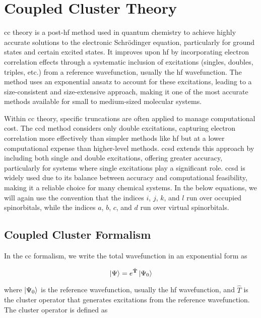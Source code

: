 \chapter{Coupled Cluster Theory}

\acrfull{cc} theory is a \acrshort{post-hf} method used in quantum chemistry to achieve highly accurate solutions to the electronic Schrödinger equation, particularly for ground states and certain excited states. It improves upon \acrshort{hf} by incorporating electron correlation effects through a systematic inclusion of excitations (singles, doubles, triples, etc.) from a reference wavefunction, usually the \acrshort{hf} wavefunction. The method uses an exponential ansatz to account for these excitations, leading to a size-consistent and size-extensive approach, making it one of the most accurate methods available for small to medium-sized molecular systems.

Within \acrshort{cc} theory, specific truncations are often applied to manage computational cost. The \acrfull{ccd} method considers only double excitations, capturing electron correlation more effectively than simpler methods like \acrshort{hf} but at a lower computational expense than higher-level methods. \acrfull{ccsd} extends this approach by including both single and double excitations, offering greater accuracy, particularly for systems where single excitations play a significant role. \acrshort{ccsd} is widely used due to its balance between accuracy and computational feasibility, making it a reliable choice for many chemical systems. In the below equations, we will again use the convention that the indices \(i\), \(j\), \(k\), and \(l\) run over occupied spinorbitals, while the indices \(a\), \(b\), \(c\), and \(d\) run over virtual spinorbitals.

\section{Coupled Cluster Formalism}

In the \acrshort{cc} formalism, we write the total wavefunction in an exponential form as

\begin{equation}
\ket{\Psi}=e^{\hat{\mathbf{T}}}\ket{\Psi_0}
\end{equation}

where \(\ket{\Psi_0}\) is the reference wavefunction, usually the \acrshort{hf} wavefunction, and \(\hat{T}\) is the cluster operator that generates excitations from the reference wavefunction. The cluster operator is defined as

